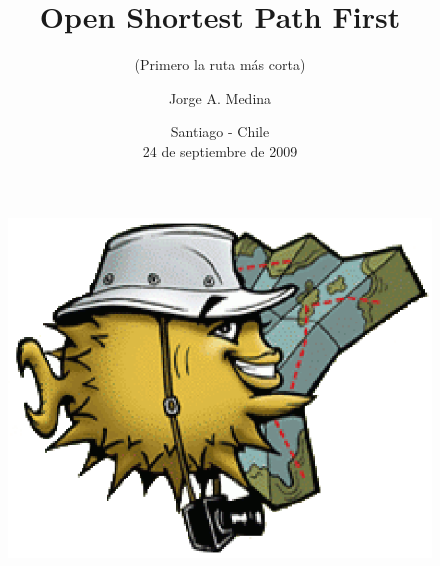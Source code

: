 \documentclass[xcolor=dvipsnames]{beamer}
\title[OSPF]{Open Shortest Path First}
\subtitle{(Primero la ruta m\'as corta)}
\author{
Jorge A. Medina
}
\institute{Instituto Profesional La Araucana}
\date{Santiago - Chile\\ 24 de septiembre de 2009}
\begin{document}
\fontsize{7}{9}
	\begin{frame}
	\begin{figure}
	\centering 	
	\includegraphics[scale=0.30]{puffyroute.eps}
	\titlepage
	\end{figure}
	\end{frame}
	
\end{document}
